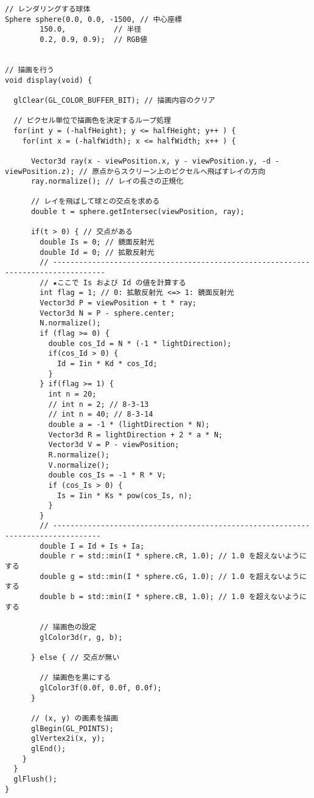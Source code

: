 \documentclass{scrartcl}
\begin{document}
\begin{verbatim}
// レンダリングする球体
Sphere sphere(0.0, 0.0, -1500, // 中心座標
        150.0,           // 半径
        0.2, 0.9, 0.9);  // RGB値


// 描画を行う
void display(void) {

  glClear(GL_COLOR_BUFFER_BIT); // 描画内容のクリア

  // ピクセル単位で描画色を決定するループ処理
  for(int y = (-halfHeight); y <= halfHeight; y++ ) {
    for(int x = (-halfWidth); x <= halfWidth; x++ ) {

      Vector3d ray(x - viewPosition.x, y - viewPosition.y, -d - viewPosition.z); // 原点からスクリーン上のピクセルへ飛ばすレイの方向
      ray.normalize(); // レイの長さの正規化

      // レイを飛ばして球との交点を求める
      double t = sphere.getIntersec(viewPosition, ray);

      if(t > 0) { // 交点がある
        double Is = 0; // 鏡面反射光
        double Id = 0; // 拡散反射光
        // ----------------------------------------------------------------------------------
        // ★ここで Is および Id の値を計算する
        int flag = 1; // 0: 拡散反射光 <=> 1: 鏡面反射光
        Vector3d P = viewPosition + t * ray;
        Vector3d N = P - sphere.center;
        N.normalize();
        if (flag >= 0) {
          double cos_Id = N * (-1 * lightDirection);
          if(cos_Id > 0) {
            Id = Iin * Kd * cos_Id;
          }
        } if(flag >= 1) {
          int n = 20;
          // int n = 2; // 8-3-13
          // int n = 40; // 8-3-14
          double a = -1 * (lightDirection * N);
          Vector3d R = lightDirection + 2 * a * N;
          Vector3d V = P - viewPosition;
          R.normalize();
          V.normalize();
          double cos_Is = -1 * R * V;
          if (cos_Is > 0) {
            Is = Iin * Ks * pow(cos_Is, n);
          }
        }
        // ---------------------------------------------------------------------------------
        double I = Id + Is + Ia;
        double r = std::min(I * sphere.cR, 1.0); // 1.0 を超えないようにする
        double g = std::min(I * sphere.cG, 1.0); // 1.0 を超えないようにする
        double b = std::min(I * sphere.cB, 1.0); // 1.0 を超えないようにする

        // 描画色の設定
        glColor3d(r, g, b);

      } else { // 交点が無い

        // 描画色を黒にする
        glColor3f(0.0f, 0.0f, 0.0f);
      }

      // (x, y) の画素を描画
      glBegin(GL_POINTS);
      glVertex2i(x, y);
      glEnd();
    }
  }
  glFlush();
}


\end{verbatim}
\end{document}
